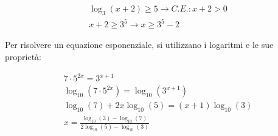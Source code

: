\begin{gather}
    \log_3(x+2) \geq 5 \rightarrow C.E.: x+2 > 0 \\
    x+2 \geq 3^5 \rightarrow x \geq 3^5 - 2
\end{gather}

Per risolvere un equazione esponenziale, si utilizzano i logaritmi e le sue proprietà:

\begin{gather}
    7\cdot5^{2x} = 3^{x+1} \\
    \log_10(7\cdot5^{2x}) = \log_10(3^{x+1}) \\
    \log_10(7) + 2x\log_10(5) = (x+1)\log_10(3) \\
    x = \frac{\log_10(3) - \log_10(7)}{2\log_10(5) - \log_10(3)}
\end{gather}